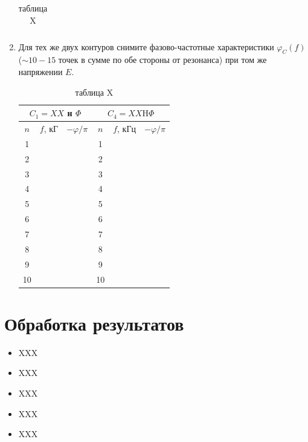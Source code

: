 \documentclass[a4paper, 12pt]{article}%
\begin{document}
\begin{enumerate}
\begin{table}[h]
\begin{tabular}{|c|c|c|c|c||c|c|c|c|c|}
\hline
\end{tabular}
\caption{таблица X}
\end{table}



\newpage
\item Для тех же двух контуров снимите фазово-частотные характеристики $\varphi_C(f)$ ($\sim 10-15$ точек в сумме по обе стороны от резонанса) при том же
напряжении $E$.


\begin{table}[h]
\begin{center}
\begin{tabular}{|c|c|c||c|c|c|}
\hline \multicolumn{3}{|c||}{$C_{1}=XX$ н $\Phi$} & \multicolumn{3}{c|}{$C_{4}=XX \mathrm{H} \Phi$} \\
\hline$n$ & $f$, кГ & $-\varphi / \pi$ & $n$ & $f$, кГц & $-\varphi / \pi$ \\
\hline 1  &   &    & 1  &   & \\
\hline 2  &   &    & 2  &   & \\
\hline 3  &   &    & 3  &   & \\
\hline 4  &   &    & 4  &   & \\
\hline 5  &   &    & 5  &   & \\
\hline 6  &   &    & 6  &   & \\
\hline 7  &   &    & 7  &   & \\
\hline 8  &   &    & 8  &   & \\
\hline 9  &   &    & 9  &   & \\
\hline 10 &   &    & 10 &   & \\
\hline
\end{tabular}
\end{center}
\caption{таблица X}
\end{table}



\end{enumerate}
\newpage

\section{Обработка результатов}

\begin{itemize}

\item XXX

\item XXX

\item XXX

\item XXX

\item XXX

\end{itemize}
\end{document}
